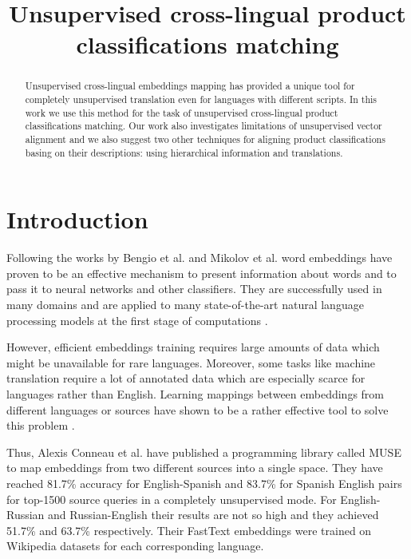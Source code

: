 \documentclass[conference]{IEEEtran}
\begin{document}
\title{Unsupervised cross-lingual product classifications matching}
\date{}%

\author{

}

\maketitle

\begin{abstract}
Unsupervised cross-lingual embeddings mapping has provided a unique tool for completely unsupervised translation even for languages with different scripts. In this work we use this method for the task of unsupervised cross-lingual product classifications matching. Our work also investigates limitations of unsupervised vector alignment and we also suggest two other techniques for aligning product classifications basing on their descriptions: using hierarchical information and translations.
\end{abstract}

\section{Introduction}
Following the works by Bengio et al. \cite{bengio} and Mikolov et al. \cite{mikolov-representations-2013} word embeddings have proven to be an effective mechanism to present information about words and to pass it to neural networks and other classifiers. They are successfully used in many domains and are applied to many state-of-the-art natural language processing models at the first stage of computations \cite{levy-goldberg-2015}.

However, efficient embeddings training requires large amounts of data which might be unavailable for rare languages. Moreover, some tasks like machine translation require a lot of annotated data which are especially scarce for languages rather than English. Learning mappings between embeddings from different languages or sources have shown to be a rather effective tool to solve this problem \cite{ruder-survey}.

Thus, Alexis Conneau et al. \cite{muse} have published a programming library called MUSE to map embeddings from two different sources into a single space. They have reached 81.7\% accuracy for English-Spanish and 83.7\% for Spanish English pairs for top-1500 source queries in a completely unsupervised mode. For English-Russian and Russian-English their results are not so high and they achieved 51.7\% and 63.7\% respectively. Their FastText embeddings were trained on Wikipedia datasets for each corresponding language. 
\end{document}
